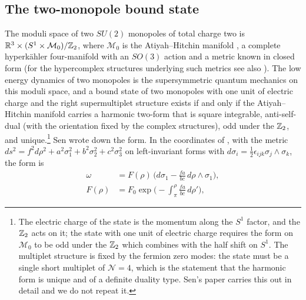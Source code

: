 \subsection{The two-monopole bound state}\label{ssec:twomonopole}

The moduli space of two $SU(2)$ monopoles of total charge two is $\mathbb{R}^3\times (S^1\times \mathcal M_0)/\mathbb{Z}_2$, where $\mathcal M_0$ is the Atiyah--Hitchin manifold \cite{AtiyahHitchin88}, a complete hyperk\"ahler four-manifold with an $SO(3)$ action and a metric known in closed form (for the hypercomplex structures underlying such metrics see also \cite{Bha22b}). The low energy dynamics of two monopoles is the supersymmetric quantum mechanics on this moduli space, and a bound state of two monopoles with one unit of electric charge and the right supermultiplet structure exists if and only if the Atiyah--Hitchin manifold carries a harmonic two-form that is square integrable, anti-self-dual (with the orientation fixed by the complex structures), odd under the $\mathbb{Z}_2$, and unique.\footnote{The electric charge of the state is the momentum along the $S^1$ factor, and the $\mathbb{Z}_2$ acts on it; the state with one unit of electric charge requires the form on $\mathcal M_0$ to be odd under the $\mathbb{Z}_2$ which combines with the half shift on $S^1$. The multiplet structure is fixed by the fermion zero modes: the state must be a single short multiplet of $\mathcal N=4$, which is the statement that the harmonic form is unique and of a definite duality type. Sen's paper carries this out in detail and we do not repeat it.} Sen wrote down the form. In the coordinates of \cite{AtiyahHitchin88}, with the metric $ds^2 = f^2 d\rho^2 + a^2\sigma_1^2 + b^2\sigma_2^2 + c^2\sigma_3^2$ on left-invariant forms with $d\sigma_i = \tfrac12\epsilon_{ijk}\sigma_j\wedge\sigma_k$, the form is
\begin{equation}\label{eq:senform}
\begin{aligned}
\omega &= F(\rho)\,\Big(d\sigma_1 - \frac{fa}{bc}\, d\rho\wedge\sigma_1\Big),\\
F(\rho) &= F_0\exp\Big(-\int_{\pi}^{\rho}\frac{fa}{bc}\,d\rho'\Big),
\end{aligned}
\end{equation}

